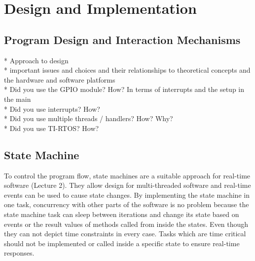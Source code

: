 \chapter{Design and Implementation} %

\section{Program Design and Interaction Mechanisms} %
* Approach to design\\
* important issues and choices and their relationships to theoretical concepts and the hardware and software platforms\\
* Did you use the GPIO module? How? In terms of interrupts and the setup in the main\\
* Did you use interrupts? How?\\ 
* Did you use multiple threads / handlers? How? Why?\\
* Did you use TI-RTOS? How?\\

\section{State Machine} %
To control the program flow, state machines are a suitable approach for real-time software (Lecture 2). They allow design for multi-threaded software and real-time events can be used to cause state changes. By implementing the state machine in one task, concurrency with other parts of the software is no problem because the state machine task can sleep between iterations and change its state based on events or the result values of methods called from inside the states. Even though they can not depict time constraints in every case. Tasks which are time critical should not be implemented or called inside a specific state to ensure real-time responses.

